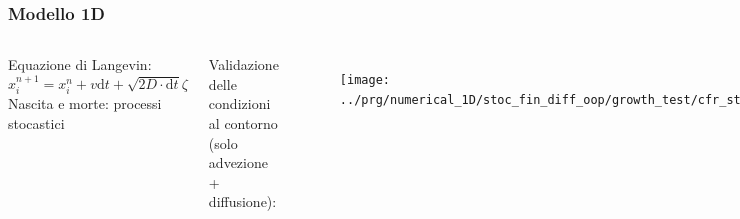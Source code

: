 \begin{frame}
  \frametitle{Modello 1D}
  \begin{columns}

    Equazione di Langevin:
      \[ x_i^{n+1} = x_i^n + v\mathrm{d}t + \sqrt{2D\cdot\mathrm{d}t}\zeta \]
      Nascita e morte: processi stocastici

    Validazione delle condizioni al contorno \\
    (solo advezione + diffusione):
    \begin{figure}[!htb]
      \centering
      \texttt{[image: ../prg/numerical\_1D/stoc\_fin\_diff\_oop/growth\_test/cfr\_stoc\_refl.pdf]}
    \end{figure}

  \end{columns}
\end{frame}

